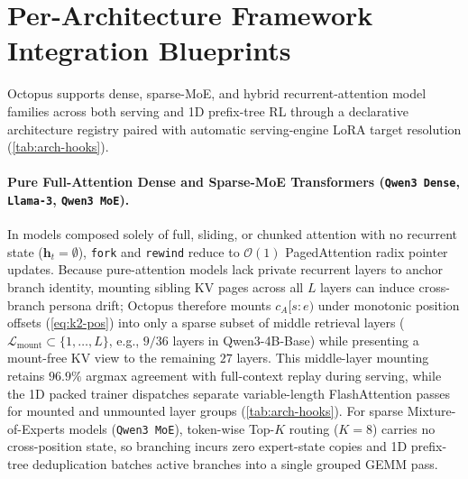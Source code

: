 \documentclass{article}
\begin{document}
\section{Per-Architecture Framework Integration Blueprints}
\label{app:arch-blueprints}

Octopus supports dense, sparse-MoE, and hybrid recurrent-attention model families across both serving and 1D prefix-tree RL through a declarative architecture registry paired with automatic serving-engine LoRA target resolution (\cref{tab:arch-hooks}).

\paragraph{Pure Full-Attention Dense and Sparse-MoE Transformers (\texttt{Qwen3 Dense}, \texttt{Llama-3}, \texttt{Qwen3 MoE}).}
In models composed solely of full, sliding, or chunked attention with no recurrent state ($\mathbf{h}_t = \emptyset$), \texttt{fork} and \texttt{rewind} reduce to $\mathcal{O}(1)$ PagedAttention radix pointer updates. Because pure-attention models lack private recurrent layers to anchor branch identity, mounting sibling KV pages across all $L$ layers can induce cross-branch persona drift; Octopus therefore mounts $c_A[s:e)$ under monotonic position offsets (\cref{eq:k2-pos}) into only a sparse subset of middle retrieval layers ($\mathcal{L}_{\text{mount}} \subset \{1,\dots,L\}$, e.g., $9/36$ layers in Qwen3-4B-Base) while presenting a mount-free KV view to the remaining $27$ layers. This middle-layer mounting retains $96.9\%$ argmax agreement with full-context replay during serving, while the 1D packed trainer dispatches separate variable-length FlashAttention passes for mounted and unmounted layer groups (\cref{tab:arch-hooks}). For sparse Mixture-of-Experts models (\texttt{Qwen3 MoE}), token-wise Top-$K$ routing ($K=8$) carries no cross-position state, so branching incurs zero expert-state copies and 1D prefix-tree deduplication batches active branches into a single grouped GEMM pass.
\end{document}
